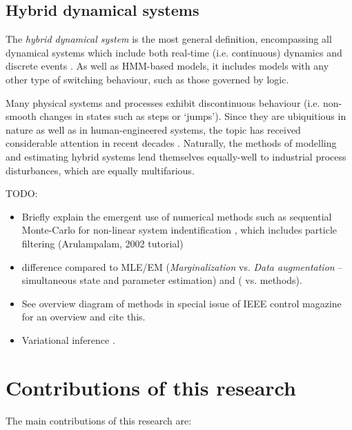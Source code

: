 \subsection*{Hybrid dynamical systems}

The \textit{hybrid dynamical system} is the most general definition, encompassing all dynamical systems which include both real-time (i.e. continuous) dynamics and discrete events \citep{van_der_schaft_introduction_2000}. As well as HMM-based models, it includes models with any other type of switching behaviour, such as those governed by logic.

Many physical systems and processes exhibit discontinuous behaviour (i.e. non-smooth changes in states such as steps or ‘jumps’). Since they are ubiquitious in nature as well as in human-engineered systems, the topic has received considerable attention in recent decades \citep{sworder_boyd_1999, bemporad_identification_2001, costa_discrete-time_2005, camacho_model_2010, djemai_hybrid_2014, estrada_hybrid_2014, guo_moving_2013, botha_hybrid_2018, bemporad_fitting_2018, oliveira_iterative_2020, piga_estimation_2020}. Naturally, the methods of modelling and estimating hybrid systems lend themselves equally-well to industrial process disturbances, which are equally multifarious.

TODO:
\begin{itemize}
 \item Briefly explain the emergent use of numerical methods such as sequential Monte-Carlo for non-linear system indentification \citep{schon_sequential_2015}, which includes particle filtering (Arulampalam, 2002 tutorial)
 \item difference compared to MLE/EM (\textit{Marginalization} vs. \textit{Data augmentation} – simultaneous state and parameter estimation) and ( vs.  methods).
  \item See overview diagram of methods in special issue of IEEE control magazine for an overview and cite this.
  \item Variational inference \citep{ma_multiple-model_2019}.
\end{itemize}

\section*{Contributions of this research}

The main contributions of this research are:

